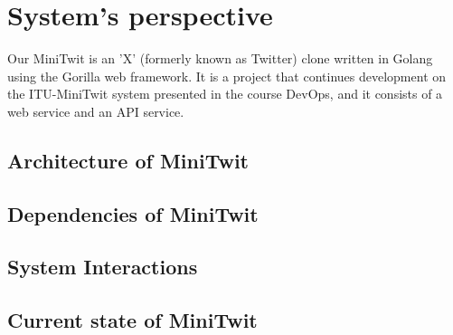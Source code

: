 \section{System's perspective}
Our MiniTwit is an 'X' (formerly known as Twitter) clone written in Golang using the Gorilla web framework. It is a project that continues development on the ITU-MiniTwit system presented in the course DevOps, and it consists of a web service and an API service. 

\subsection{Architecture of MiniTwit}


\subsection{Dependencies of MiniTwit}


\subsection{System Interactions}


\subsection{Current state of MiniTwit}
